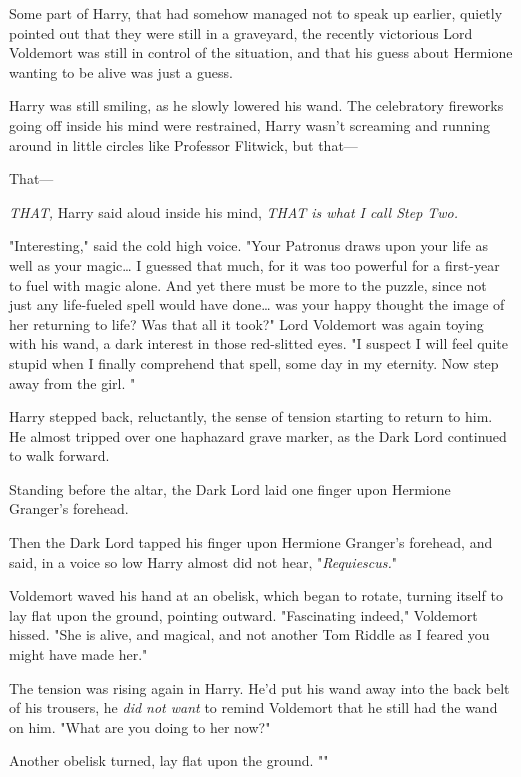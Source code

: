 Some part of Harry, that had somehow managed not to speak up earlier, quietly
pointed out that they were still in a graveyard, the recently victorious Lord
Voldemort was still in control of the situation, and that his guess about
Hermione wanting to be alive was just a guess.

Harry was still smiling, as he slowly lowered his wand. The celebratory
fireworks going off inside his mind were restrained, Harry wasn't screaming and
running around in little circles like Professor Flitwick, but that---

That---

\emph{THAT,} Harry said aloud inside his mind, \emph{THAT is what I call Step
Two.}

"Interesting," said the cold high voice. "Your Patronus draws upon your life as
well as your magic{\ldots} I guessed that much, for it was too powerful for a
first-year to fuel with magic alone. And yet there must be more to the puzzle,
since not just any life-fueled spell would have done{\ldots} was your happy
thought the image of her returning to life? Was that all it took?" Lord
Voldemort was again toying with his wand, a dark interest in those red-slitted
eyes. "I suspect I will feel quite stupid when I finally comprehend that spell,
some day in my eternity. Now step away from the girl. "

Harry stepped back, reluctantly, the sense of tension starting to return to
him. He almost tripped over one haphazard grave marker, as the Dark Lord
continued to walk forward.

Standing before the altar, the Dark Lord laid one finger upon Hermione
Granger's forehead.

Then the Dark Lord tapped his finger upon Hermione Granger's forehead, and
said, in a voice so low Harry almost did not hear, "\emph{Requiescus.}"

Voldemort waved his hand at an obelisk, which began to rotate, turning itself
to lay flat upon the ground, pointing outward. "Fascinating indeed," Voldemort
hissed. "She is alive, and magical, and not another Tom Riddle as I feared you
might have made her."

The tension was rising again in Harry. He'd put his wand away into the back
belt of his trousers, he \emph{did not want} to remind Voldemort that he still had
the wand on him. "What are you doing to her now?"

Another obelisk turned, lay flat upon the ground. ""

